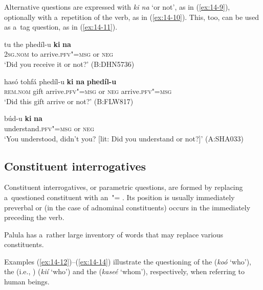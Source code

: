 Alternative questions are expressed with \textit{ki na} `or not', as in (\ref{ex:14-9}), optionally with a~repetition of the verb, as in (\ref{ex:14-10}). This, too, can be used as a~tag question, as in (\ref{ex:14-11}).

\begin{exe}
\ex
\label{ex:14-9}
\gll tu the phedíl-u \textbf{ki} \textbf{na} \\
\textsc{2sg.nom} to arrive.\textsc{pfv"=msg} or \textsc{neg} \\
\glt `Did you receive it or not?' (B:DHN5736)

\ex
\label{ex:14-10}
\gll hasó tohfá phedíl-u \textbf{ki} \textbf{na} \textbf{phedíl-u}  \\
\textsc{rem.nom} gift arrive.\textsc{pfv"=msg} or \textsc{neg}  arrive.\textsc{pfv"=msg} \\
\glt `Did this gift arrive or not?' (B:FLW817)

\ex
\label{ex:14-11}
\gll búd-u \textbf{ki} \textbf{na} \\
understand.\textsc{pfv"=msg} or \textsc{neg} \\
\glt `You understood, didn't you? [lit: Did you understand or not?]' (A:SHA033)
\end{exe}
\subsection{Constituent interrogatives}
\label{subsec:14-2-2}

Constituent interrogatives, or parametric questions, are formed by replacing a~questioned constituent with an~"= . Its position is usually immediately preverbal or (in the case of adnominal constituents) occurs in the  immediately preceding the verb.


Palula has a~rather large inventory of  words that may replace various constituents.


 Examples (\ref{ex:14-12})--(\ref{ex:14-14}) illustrate the questioning of the   (\textit{koó} `who'), the  (i.e., )  (\textit{kií} `who') and the   (\textit{kaseé} `whom'), respectively, when referring to human beings.

